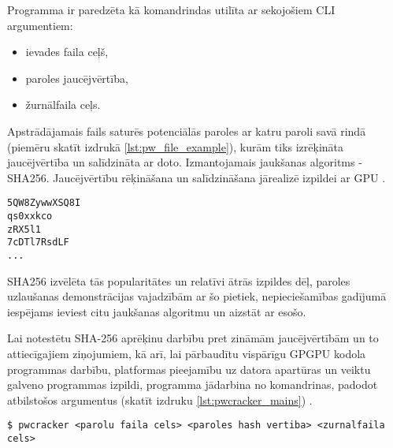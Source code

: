 Programma ir paredzēta kā komandrindas utilīta ar sekojošiem CLI argumentiem:
\begin{itemize}
    \item ievades faila ceļš,
    \item paroles jaucējvērtība,
    \item žurnālfaila ceļs.
\end{itemize}

Apstrādājamais fails saturēs potenciālās paroles ar katru paroli savā rindā
(piemēru skatīt izdrukā \ref{lst:pw_file_example}), kurām tiks izrēķināta
jaucējvērtība un salīdzināta ar doto. Izmantojamais jaukšanas algoritms -
SHA256. Jaucējvērtību rēķināšana un salīdzināšana jārealizē izpildei ar GPU
\cite{kursa-darbs}.

\begin{lstlisting}[caption={Paroļu ieejas faila piemērs ar nejauši ģenerētām
    parolēm}, captionpos=b, label=lst:pw_file_example]
5QW8ZywwXSQ8I
qs0xxkco
zRX5l1
7cDTl7RsdLF
...
\end{lstlisting}

SHA256 izvēlēta tās popularitātes un relatīvi ātrās izpildes dēļ,
paroles uzlaušanas demonstrācijas vajadzībām ar šo pietiek, nepieciešamības
gadījumā iespējams ieviest citu jaukšanas algoritmu un aizstāt ar esošo.

Lai notestētu SHA-256 aprēķinu darbību pret zināmām jaucējvērtībām un to
attiecīgajiem ziņojumiem, kā arī, lai pārbaudītu vispārīgu GPGPU kodola
programmas darbību, platformas pieejamību uz datora apartūras un veiktu
galveno programmas izpildi, programma jādarbina no komandrinas, padodot
atbilstošos argumentus (skatīt izdruku  \ref{lst:pwcracker_mains}) \cite{kursa-darbs}.

\begin{lstlisting}[caption={Programmas galvenā izpilde}, captionpos=b, 
    label=lst:pwcracker_mains]
$ pwcracker <parolu faila cels> <paroles hash vertiba> <zurnalfaila cels>
\end{lstlisting}

